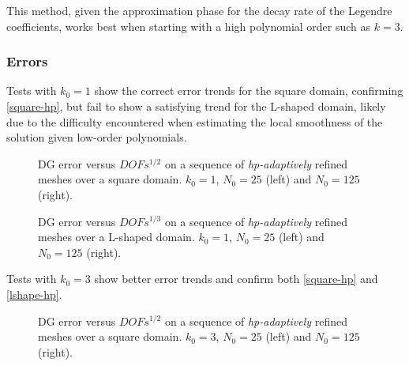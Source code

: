 This method, given the approximation phase for the decay rate of the Legendre coefficients, works best when starting with a high polynomial order such as $k = 3$.

\newpage
\subsubsection{Errors}

Tests with $k_0 = 1$ show the correct error trends for the square domain, confirming \eqref{square-hp}, but fail to show a satisfying trend for the L-shaped domain, likely due to the difficulty encountered when estimating the local smoothness of the solution given low-order polynomials.

\begin{figure}[!ht]
    \begin{subfigure}[b]{0.45\textwidth}
		
	\end{subfigure}
	\hfill
	\begin{subfigure}[b]{0.45\textwidth}
		
	\end{subfigure}
    \caption{DG error versus $DOFs^{1/2}$ on a sequence of \textit{hp-adaptively} refined meshes over a square domain. $k_0 = 1$, $N_0 = 25$ (left) and $N_0 = 125$ (right).}
\end{figure}

\begin{figure}[!ht]
    \begin{subfigure}[b]{0.45\textwidth}
		
	\end{subfigure}
	\hfill
	\begin{subfigure}[b]{0.45\textwidth}
		
	\end{subfigure}
    \caption{DG error versus $DOFs^{1/3}$ on a sequence of \textit{hp-adaptively} refined meshes over a L-shaped domain. $k_0 = 1$, $N_0 = 25$ (left) and $N_0 = 125$ (right).}
\end{figure}

\newpage

Tests with $k_0 = 3$ show better error trends and confirm both \eqref{square-hp} and \eqref{lshape-hp}.

\begin{figure}[!ht]
    \begin{subfigure}[b]{0.45\textwidth}
		
	\end{subfigure}
	\hfill
	\begin{subfigure}[b]{0.45\textwidth}
		
	\end{subfigure}
    \caption{DG error versus $DOFs^{1/2}$ on a sequence of \textit{hp-adaptively} refined meshes over a square domain. $k_0 = 3$, $N_0 = 25$ (left) and $N_0 = 125$ (right).}
\end{figure}

